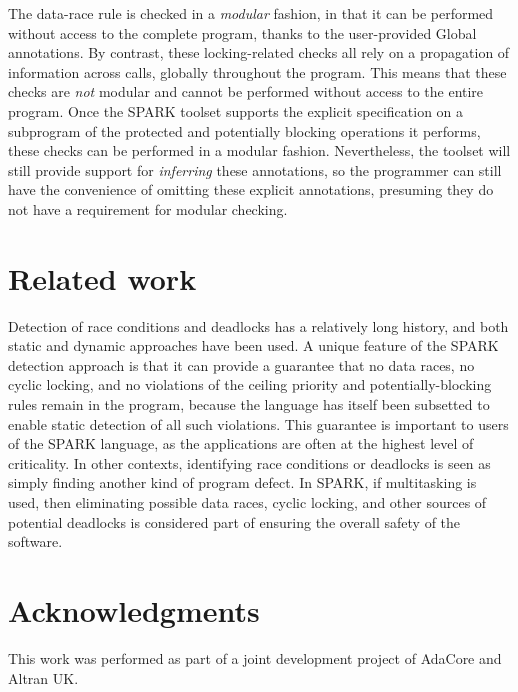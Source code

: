 \documentclass[conference,compsoc]{IEEEtran}
\begin{document}
The data-race rule is checked in a \emph{modular} fashion, in that it can
be performed without access to the complete program, thanks to the
user-provided Global annotations. By contrast, these locking-related checks
all rely on a propagation of information across calls, globally throughout
the program. This means that these checks are \emph{not} modular and cannot
be performed without access to the entire program. Once the SPARK toolset
supports the explicit specification on a subprogram of the protected and
potentially blocking operations it performs, these checks can be performed
in a modular fashion. Nevertheless, the toolset will still provide support
for \emph{inferring} these annotations, so the programmer can still have
the convenience of omitting these explicit annotations, presuming they do
not have a requirement for modular checking.

\section{Related work}
Detection of race conditions and deadlocks has a relatively long history,
and both static \cite{engler2003racerx} and dynamic \cite{yu2005racetrack}
approaches have been used. A unique feature of the SPARK detection approach
is that it can provide a guarantee that no data races, no cyclic locking,
and no violations of the ceiling priority and potentially-blocking rules
remain in the program, because the language has itself been subsetted to
enable static detection of all such violations. This guarantee is important
to users of the SPARK language, as the applications are often at the
highest level of criticality. In other contexts, identifying race
conditions or deadlocks is seen as simply finding another kind of program
defect. In SPARK, if multitasking is used, then eliminating possible data
races, cyclic locking, and other sources of potential deadlocks is
considered part of ensuring the overall safety of the software.


\section*{Acknowledgments}
This work was performed as part of a joint development project of AdaCore
and Altran UK.



\end{document}
